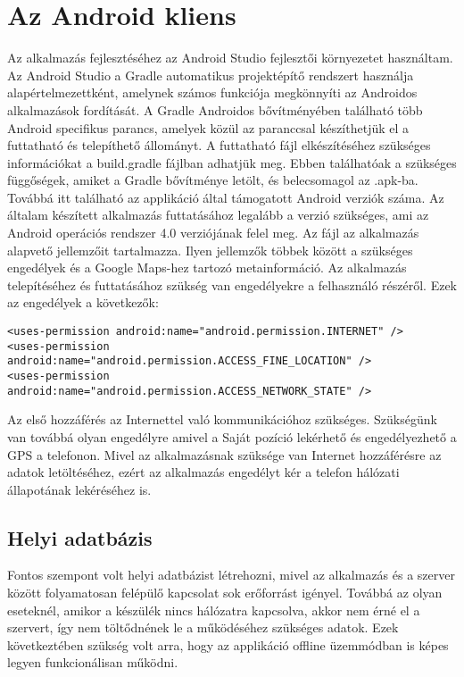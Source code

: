 \section{Az Android kliens}
\label{androidclient}
Az alkalmazás fejlesztéséhez az Android Studio fejlesztői környezetet használtam.
Az Android Studio a Gradle automatikus projektépítő rendszert használja alapértelmezettként, amelynek számos funkciója megkönnyíti az Androidos alkalmazások fordítását.
A Gradle Androidos bővítményében található több Android specifikus parancs, amelyek közül az  paranccsal készíthetjük el a futtatható és telepíthető állományt.
A futtatható fájl elkészítéséhez szükséges információkat a build.gradle fájlban adhatjük meg.
Ebben találhatóak a szükséges függőségek, amiket a Gradle bővítménye letölt, és belecsomagol az .apk-ba.
Továbbá itt található az applikáció által támogatott Android verziók száma.
Az általam készített alkalmazás futtatásához legalább a  verzió szükséges, ami az Android operációs rendszer 4.0 verziójának felel meg.
Az  fájl az alkalmazás alapvető jellemzőit tartalmazza.
Ilyen jellemzők többek között a szükséges engedélyek és a Google Maps-hez tartozó metainformáció.
Az alkalmazás telepítéséhez és futtatásához szükség van engedélyekre a felhasználó részéről.
Ezek az engedélyek a következők:
\begin{lstlisting}
<uses-permission android:name="android.permission.INTERNET" /> 
<uses-permission android:name="android.permission.ACCESS_FINE_LOCATION" />
<uses-permission android:name="android.permission.ACCESS_NETWORK_STATE" />
\end{lstlisting}

Az első hozzáférés az Internettel való kommunikációhoz szükséges.
Szükségünk van továbbá olyan engedélyre amivel a Saját pozíció lekérhető és engedélyezhető a GPS a telefonon.
Mivel az alkalmazásnak szüksége van Internet hozzáférésre az adatok letöltéséhez, ezért az alkalmazás engedélyt kér a telefon hálózati állapotának lekéréséhez is.

\subsection*{Helyi adatbázis}
\label{localdatabase}
Fontos szempont volt helyi adatbázist létrehozni, mivel az alkalmazás és a szerver között folyamatosan felépülő kapcsolat sok erőforrást igényel.
Továbbá az olyan eseteknél, amikor a készülék nincs hálózatra kapcsolva, akkor nem érné el a szervert, így nem töltődnének le a működéséhez szükséges adatok.
Ezek következtében szükség volt arra, hogy az applikáció offline üzemmódban is képes legyen funkcionálisan működni.

